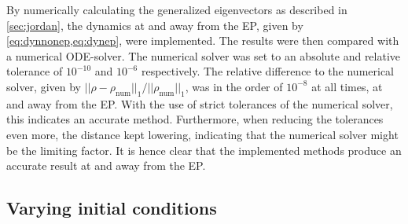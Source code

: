 \documentclass[../main.tex]{subfiles}
\begin{document}
By numerically calculating the generalized eigenvectors as described in \cref{sec:jordan}, the dynamics at and away from the EP, given by \cref{eq:dynnonep,eq:dynep}, were implemented. The results were then compared with a numerical ODE-solver. The numerical solver was set to an absolute and relative tolerance of $10^{-10}$ and $10^{-6}$ respectively. The relative difference to the numerical solver, given by $||\rho - \rho_\text{num}||_1/||\rho_\text{num}||_1$, was in the order of $10^{-8}$ at all times, at and away from the EP. With the use of strict tolerances of the numerical solver, this indicates an accurate method. Furthermore, when reducing the tolerances even more, the distance kept lowering, indicating that the numerical solver might be the limiting factor. It is hence clear that the implemented methods produce an accurate result at and away from the EP. 



\subsection{Varying initial conditions}
\end{document}
